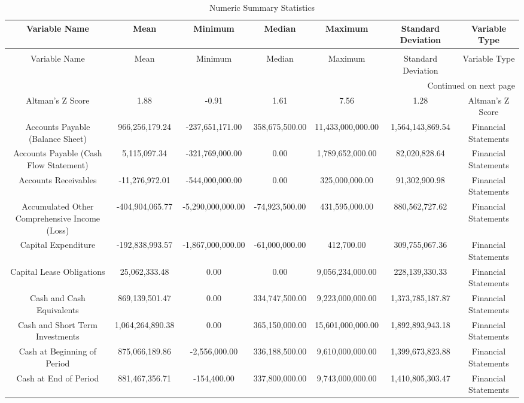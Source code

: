 \tiny
\begin{longtable}{ccccccc}
\caption{Numeric Summary Statistics} \label{tab:numeric_summary_statistics} \\
\toprule
Variable Name & Mean & Minimum & Median & Maximum & Standard Deviation & Variable Type \\
\midrule
\endfirsthead
\caption[]{Numeric Summary Statistics} \\
\toprule
Variable Name & Mean & Minimum & Median & Maximum & Standard Deviation & Variable Type \\
\midrule
\endhead
\midrule
\multicolumn{7}{r}{Continued on next page} \\
\midrule
\endfoot
\bottomrule
\endlastfoot
Altman's Z Score & 1.88 & -0.91 & 1.61 & 7.56 & 1.28 & Altman's Z Score \\
Accounts Payable (Balance Sheet) & 966,256,179.24 & -237,651,171.00 & 358,675,500.00 & 11,433,000,000.00 & 1,564,143,869.54 & Financial Statements \\
Accounts Payable (Cash Flow Statement) & 5,115,097.34 & -321,769,000.00 & 0.00 & 1,789,652,000.00 & 82,020,828.64 & Financial Statements \\
Accounts Receivables & -11,276,972.01 & -544,000,000.00 & 0.00 & 325,000,000.00 & 91,302,900.98 & Financial Statements \\
Accumulated Other Comprehensive Income (Loss) & -404,904,065.77 & -5,290,000,000.00 & -74,923,500.00 & 431,595,000.00 & 880,562,727.62 & Financial Statements \\
Capital Expenditure & -192,838,993.57 & -1,867,000,000.00 & -61,000,000.00 & 412,700.00 & 309,755,067.36 & Financial Statements \\
Capital Lease Obligations & 25,062,333.48 & 0.00 & 0.00 & 9,056,234,000.00 & 228,139,330.33 & Financial Statements \\
Cash and Cash Equivalents & 869,139,501.47 & 0.00 & 334,747,500.00 & 9,223,000,000.00 & 1,373,785,187.87 & Financial Statements \\
Cash and Short Term Investments & 1,064,264,890.38 & 0.00 & 365,150,000.00 & 15,601,000,000.00 & 1,892,893,943.18 & Financial Statements \\
Cash at Beginning of Period & 875,066,189.86 & -2,556,000.00 & 336,188,500.00 & 9,610,000,000.00 & 1,399,673,823.88 & Financial Statements \\
Cash at End of Period & 881,467,356.71 & -154,400.00 & 337,800,000.00 & 9,743,000,000.00 & 1,410,805,303.47 & Financial Statements \\

\end{longtable}
